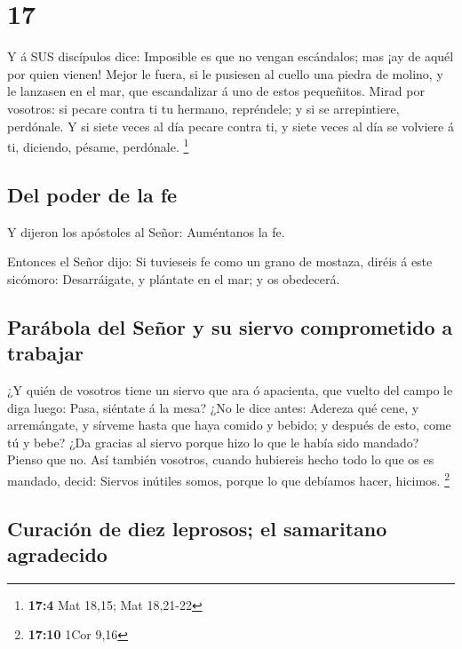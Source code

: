 \hypertarget{section-16}{%
\section{17}\label{section-16}}

 Y á SUS discípulos dice: Imposible es que no vengan
escándalos; mas ¡ay de aquél por quien vienen!  Mejor le
fuera, si le pusiesen al cuello una piedra de molino, y le lanzasen en
el mar, que escandalizar á uno de estos pequeñitos.  Mirad
por vosotros: si pecare contra ti tu hermano, repréndele; y si se
arrepintiere, perdónale.  Y si siete veces al día pecare
contra ti, y siete veces al día se volviere á ti, diciendo, pésame,
perdónale. \footnote{\textbf{17:4} Mat 18,15; Mat 18,21-22}

\hypertarget{del-poder-de-la-fe}{%
\subsection{Del poder de la fe}\label{del-poder-de-la-fe}}

 Y dijeron los apóstoles al Señor: Auméntanos la fe.

 Entonces el Señor dijo: Si tuvieseis fe como un grano de
mostaza, diréis á este sicómoro: Desarráigate, y plántate en el mar; y
os obedecerá.

\hypertarget{paruxe1bola-del-seuxf1or-y-su-siervo-comprometido-a-trabajar}{%
\subsection{Parábola del Señor y su siervo comprometido a
trabajar}\label{paruxe1bola-del-seuxf1or-y-su-siervo-comprometido-a-trabajar}}

 ¿Y quién de vosotros tiene un siervo que ara ó apacienta,
que vuelto del campo le diga luego: Pasa, siéntate á la mesa?
 ¿No le dice antes: Adereza qué cene, y arremángate, y
sírveme hasta que haya comido y bebido; y después de esto, come tú y
bebe?  ¿Da gracias al siervo porque hizo lo que le había
sido mandado? Pienso que no.  Así también vosotros, cuando
hubiereis hecho todo lo que os es mandado, decid: Siervos inútiles
somos, porque lo que debíamos hacer, hicimos. \footnote{\textbf{17:10}
  1Cor 9,16}

\hypertarget{curaciuxf3n-de-diez-leprosos-el-samaritano-agradecido}{%
\subsection{Curación de diez leprosos; el samaritano
agradecido}\label{curaciuxf3n-de-diez-leprosos-el-samaritano-agradecido}}

